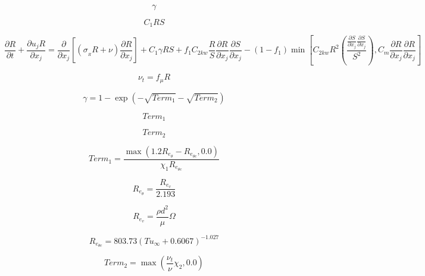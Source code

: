 

\begin{equation}
\gamma
\end{equation}

\begin{equation}
C_1RS
\end{equation}

\begin{equation}
\frac{\partial R}{\partial t} + \frac{\partial u_j R}{\partial x_j} = \frac{\partial}{\partial x_j} 
\left[(\sigma_{{}_R} R+\nu)\frac{\partial R}{\partial x_j}\right]+C_1\gamma RS + 
f_1 C_{2kw}\frac{R}{S}\frac{\partial R}{\partial x_j}\frac{\partial S}{\partial x_j}
-(1-f_1)\min\left[C_{2kw}R^2\left(\frac{\frac{\partial S}{\partial x_j}\frac{\partial S}{\partial x_j}}{S^2}\right), 
C_m\frac{\partial R}{\partial x_j}\frac{\partial R}{\partial x_j}\right]
\end{equation}

\begin{equation}
\nu_t=f_\mu R
\end{equation}

\begin{equation}
\gamma=1-\exp\left(-\sqrt{Term_1}-\sqrt{Term_2}\right)
\end{equation}

\begin{equation}
Term_1
\end{equation}

\begin{equation}
Term_2
\end{equation}

\begin{equation}
Term_1=\frac{\max(1.2 R_{e_\theta}-R_{e_{\theta c}},0.0)}{\chi_1 R_{e_{\theta c}}}
\end{equation}

\begin{equation}
R_{e_\theta}=\frac{R_{e_v}}{2.193}
\end{equation}

\begin{equation}
R_{e_v}=\frac{\rho d^2}{\mu}\Omega
\end{equation}

\begin{equation}
R_{e_{\theta c}}=803.73(Tu_\infty + 0.6067)^{-1.027}
\end{equation}

\begin{equation}
Term_2=\max\left(\frac{\nu_t}{\nu}\chi_2, 0.0\right)
\end{equation}

